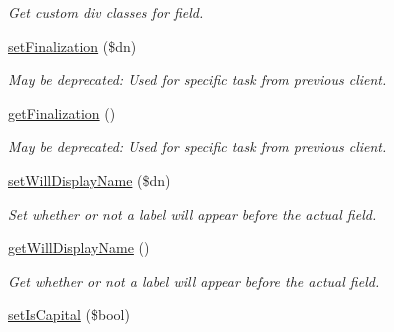 \begin{DoxyCompactItemize}
\begin{DoxyCompactList}\small\item\em Get custom div classes for field. \end{DoxyCompactList}\item 
\hypertarget{class_fields_ad8196fba0b5aa1f325ab4b46477bf147}{\hyperlink{class_fields_ad8196fba0b5aa1f325ab4b46477bf147}{set\-Finalization} (\$dn)}\label{class_fields_ad8196fba0b5aa1f325ab4b46477bf147}

\begin{DoxyCompactList}\small\item\em May be deprecated\-: Used for specific task from previous client. \end{DoxyCompactList}\item 
\hypertarget{class_fields_a971544d42becf229e8b472fc4bd6662c}{\hyperlink{class_fields_a971544d42becf229e8b472fc4bd6662c}{get\-Finalization} ()}\label{class_fields_a971544d42becf229e8b472fc4bd6662c}

\begin{DoxyCompactList}\small\item\em May be deprecated\-: Used for specific task from previous client. \end{DoxyCompactList}\item 
\hypertarget{class_fields_aa72ae1ae3cc8dd09eccc5d0db3c1b57e}{\hyperlink{class_fields_aa72ae1ae3cc8dd09eccc5d0db3c1b57e}{set\-Will\-Display\-Name} (\$dn)}\label{class_fields_aa72ae1ae3cc8dd09eccc5d0db3c1b57e}

\begin{DoxyCompactList}\small\item\em Set whether or not a label will appear before the actual field. \end{DoxyCompactList}\item 
\hypertarget{class_fields_a5079e029359e2c1d8a16e6041fcea9e1}{\hyperlink{class_fields_a5079e029359e2c1d8a16e6041fcea9e1}{get\-Will\-Display\-Name} ()}\label{class_fields_a5079e029359e2c1d8a16e6041fcea9e1}

\begin{DoxyCompactList}\small\item\em Get whether or not a label will appear before the actual field. \end{DoxyCompactList}\item 
\hypertarget{class_fields_a0a13d142a737f59d9b56857a937212aa}{\hyperlink{class_fields_a0a13d142a737f59d9b56857a937212aa}{set\-Is\-Capital} (\$bool)}\label{class_fields_a0a13d142a737f59d9b56857a937212aa}


\end{DoxyCompactItemize}
